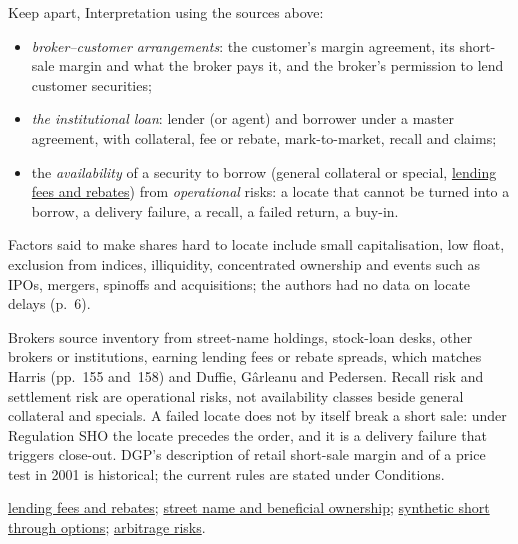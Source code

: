 \begin{qfmechanism}
 Keep apart, Interpretation using the sources above:
\begin{itemize}
\item \emph{broker--customer arrangements}: the customer's margin agreement, its short-sale margin and what the broker pays it, and the broker's permission to lend customer securities;
\item \emph{the institutional loan}: lender (or agent) and borrower under a master agreement, with collateral, fee or rebate, mark-to-market, recall and claims;
\item the \emph{availability} of a security to borrow (general collateral or special, \hyperref[def:securities-lending-fee-rebate]{lending fees and rebates}) from \emph{operational} risks: a locate that cannot be turned into a borrow, a delivery failure, a recall, a failed return, a buy-in.
\end{itemize}
Factors said to make shares hard to locate include small capitalisation, low float, exclusion from indices, illiquidity, concentrated ownership and events such as IPOs, mergers, spinoffs and acquisitions; the authors had no data on locate delays (p.~6).

 Brokers source inventory from street-name holdings, stock-loan desks, other brokers or institutions, earning lending fees or rebate spreads, which matches Harris (pp.~155 and~158) and Duffie, Gârleanu and Pedersen. Recall risk and settlement risk are operational risks, not availability classes beside general collateral and specials. A failed locate does not by itself break a short sale: under Regulation SHO the locate precedes the order, and it is a delivery failure that triggers close-out. DGP's description of retail short-sale margin and of a price test in 2001 is historical; the current rules are stated under Conditions.

 \hyperref[def:securities-lending-fee-rebate]{lending fees and rebates}; \hyperref[def:street-name-beneficial-ownership]{street name and beneficial ownership}; \hyperref[res:synthetic-short-put-call]{synthetic short through options}; \hyperref[res:arbitrage-risks]{arbitrage risks}.

\end{qfmechanism}

